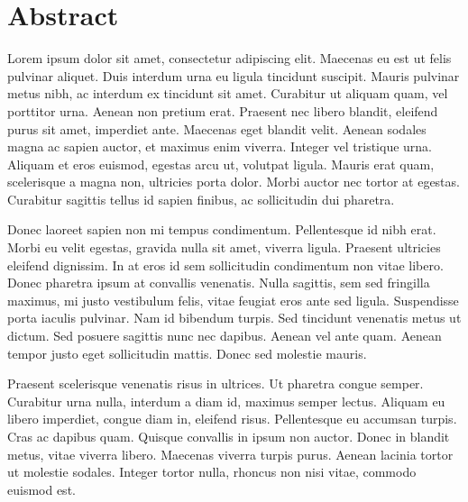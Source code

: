 \chapter*{Abstract}

Lorem ipsum dolor sit amet, consectetur adipiscing elit. Maecenas eu est ut felis pulvinar aliquet. Duis interdum urna eu ligula tincidunt suscipit. Mauris pulvinar metus nibh, ac interdum ex tincidunt sit amet. Curabitur ut aliquam quam, vel porttitor urna. Aenean non pretium erat. Praesent nec libero blandit, eleifend purus sit amet, imperdiet ante. Maecenas eget blandit velit. Aenean sodales magna ac sapien auctor, et maximus enim viverra. Integer vel tristique urna. Aliquam et eros euismod, egestas arcu ut, volutpat ligula. Mauris erat quam, scelerisque a magna non, ultricies porta dolor. Morbi auctor nec tortor at egestas. Curabitur sagittis tellus id sapien finibus, ac sollicitudin dui pharetra.

Donec laoreet sapien non mi tempus condimentum. Pellentesque id nibh erat. Morbi eu velit egestas, gravida nulla sit amet, viverra ligula. Praesent ultricies eleifend dignissim. In at eros id sem sollicitudin condimentum non vitae libero. Donec pharetra ipsum at convallis venenatis. Nulla sagittis, sem sed fringilla maximus, mi justo vestibulum felis, vitae feugiat eros ante sed ligula. Suspendisse porta iaculis pulvinar. Nam id bibendum turpis. Sed tincidunt venenatis metus ut dictum. Sed posuere sagittis nunc nec dapibus. Aenean vel ante quam. Aenean tempor justo eget sollicitudin mattis. Donec sed molestie mauris.

Praesent scelerisque venenatis risus in ultrices. Ut pharetra congue semper. Curabitur urna nulla, interdum a diam id, maximus semper lectus. Aliquam eu libero imperdiet, congue diam in, eleifend risus. Pellentesque eu accumsan turpis. Cras ac dapibus quam. Quisque convallis in ipsum non auctor. Donec in blandit metus, vitae viverra libero. Maecenas viverra turpis purus. Aenean lacinia tortor ut molestie sodales. Integer tortor nulla, rhoncus non nisi vitae, commodo euismod est. 